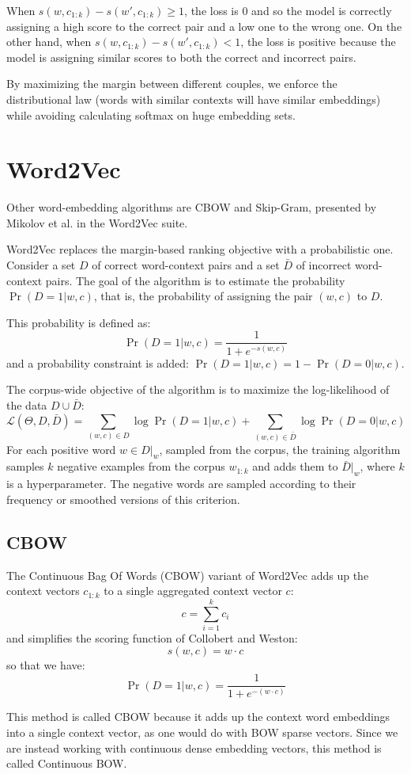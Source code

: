 When \(s(w,c_{1:k}) - s(w', c_{1:k}) \geq 1\), the loss is \(0\) and so the model is correctly assigning a high score to the correct pair and a low one to the wrong one.
On the other hand, when \(s(w,c_{1:k}) - s(w', c_{1:k}) < 1\), the loss is positive because the model is assigning similar scores to both the correct and incorrect pairs.

By maximizing the margin between different couples, we enforce the distributional law (words with similar contexts will have similar embeddings) while avoiding calculating softmax on huge embedding sets.

\section{Word2Vec}
Other word-embedding algorithms are CBOW and Skip-Gram, presented by Mikolov et al. in the Word2Vec suite.

Word2Vec replaces the margin-based ranking objective with a probabilistic one. Consider a set $D$ of correct word-context pairs and a set $\bar{D}$ of incorrect word-context pairs. The goal of the algorithm is to estimate the probability $\Pr(D=1|w,c)$, that is, the probability of assigning the pair $(w,c)$ to $D$.

This probability is defined as:
\[
\Pr(D=1|w,c)=\frac{1}{1 + e^{-s(w,c)}}
\]
and a probability constraint is added: $\Pr(D=1|w,c)=1-\Pr(D=0|w,c)$.

The corpus-wide objective of the algorithm is to maximize the log-likelihood of the data $D\cup \bar{D}$:
\[
\mathcal{L}(\Theta, D, \bar{D})=\sum_{(w,c) \in D}\log\Pr(D=1|w,c) + \sum_{(w,c) \in \bar{D}}\log\Pr(D=0|w,c)
\]
For each positive word $w\in D|_{w}$, sampled from the corpus, the training algorithm samples $k$ negative examples from the corpus $w_{1:k}$ and adds them to $\bar{D}|_{w}$, where $k$ is a hyperparameter. The negative words are sampled according to their frequency or smoothed versions of this criterion.

\subsection{CBOW}
The Continuous Bag Of Words (CBOW) variant of Word2Vec adds up the context vectors $c_{1:k}$ to a single aggregated context vector $c$:
\[
c=\sum_{i=1}^{k}c_{i}
\]
and simplifies the scoring function of Collobert and Weston:
\[
s(w,c)=w\cdot c
\]
so that we have:
\[
\Pr(D=1|w,c)=\frac{1}{1+e^{-(w\cdot c)}}
\]

\begin{note}{}
    This method is called CBOW because it adds up the context word embeddings into a single context vector, as one would do with BOW sparse vectors. Since we are instead working with continuous dense embedding vectors, this method is called Continuous BOW.
\end{note}

